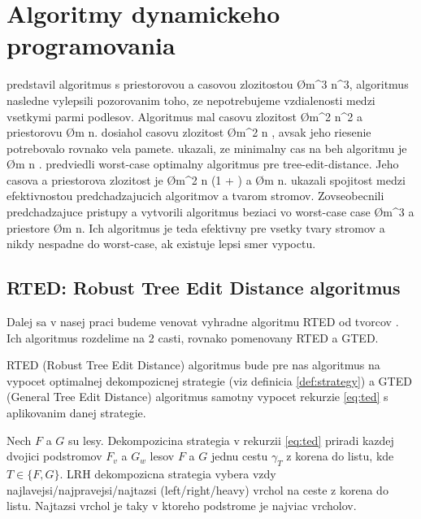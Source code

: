 \section{Algoritmy dynamickeho programovania}

\citet{TAI} predstavil algoritmus s priestorovou a casovou zlozitostou \O{m^3 \cdot n^3},
\citet{ZHANGSHASHA} algoritmus nasledne vylepsili pozorovanim toho, ze nepotrebujeme
vzdialenosti medzi vsetkymi parmi podlesov. Algoritmus mal casovu zlozitost \O{m^2 \cdot n^2}
a priestorovu \O{m \cdot n}. \citet{KLEIN} dosiahol casovu zlozitost \O{m^2 \cdot n \cdot {}},
avsak jeho riesenie potrebovalo rovnako vela pamete.
\citet{DALUCQ} ukazali, ze minimalny cas na beh algoritmu je \O{m \cdot n \cdot {} \cdot {}}.
\citet{DMRW} predviedli worst-case optimalny algoritmus pre tree-edit-distance.
Jeho casova a priestorova zlozitost je \O{m^2 \cdot n \cdot (1 + )} a
\O{m \cdot n}. \citet{RTED} ukazali spojitost medzi efektivnostou predchadzajucich algoritmov
a tvarom stromov. Zovseobecnili predchadzajuce pristupy a vytvorili algoritmus beziaci
vo worst-case case \O{m^3} a priestore \O{m \cdot n}. Ich algoritmus je teda efektivny pre vsetky
tvary stromov a nikdy nespadne do worst-case, ak existuje lepsi smer vypoctu. 



\subsection{RTED: Robust Tree Edit Distance algoritmus}

Dalej sa v nasej praci budeme venovat vyhradne algoritmu RTED od tvorcov \citet{RTED}.
Ich algoritmus rozdelime na 2 casti, rovnako pomenovany RTED a GTED.

RTED (Robust Tree Edit Distance) algoritmus bude pre nas algoritmus na vypocet
optimalnej dekompozicnej strategie (viz definicia \ref{def:strategy})
a GTED (General Tree Edit Distance) algoritmus samotny vypocet rekurzie \ref{eq:ted}
s aplikovanim danej strategie.

\begin{definice}\label{def:strategy}
	Nech $F$ a $G$ su lesy. Dekompozicina strategia v rekurzii \ref{eq:ted} priradi
  kazdej dvojici podstromov $F_{v}$ a $G_{w}$ lesov $F$ a $G$ jednu cestu $\gamma_{T}$
  z korena do listu, kde $T \in \{F, G\}$.
	LRH dekompozicna strategia vybera vzdy najlavejsi/najpravejsi/najtazsi
	(left/right/heavy) vrchol na ceste z korena do listu. Najtazsi vrchol je taky
	v ktoreho podstrome je najviac vrcholov. 
\end{definice}


